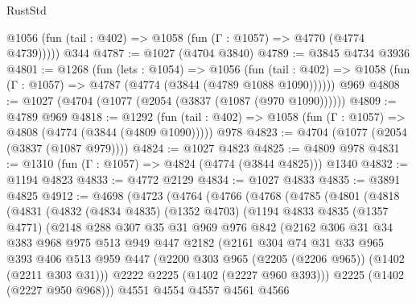 \begin{lexlean}{RustStd}
\begin{coremodule}
      @1056 (fun (tail : @402) => @1058 (fun (Γ : @1057) => @4770 (@4774 @4739)))))
    @344
@4787 := @1027 (@4704 @3840)
@4789 := @3845 @4734 @3936
@4801 := @1268
    (fun (lets : @1054) =>
    @1056
      (fun (tail : @402) => @1058 (fun (Γ : @1057) => @4787 (@4774 (@3844 (@4789 @1088 @1090))))))
    @969
@4808 := @1027 (@4704 (@1077 (@2054 (@3837 (@1087 (@970 @1090))))))
@4809 := @4789 @969
@4818 := @1292
    (fun (tail : @402) => @1058 (fun (Γ : @1057) => @4808 (@4774 (@3844 (@4809 @1090)))))
    @978
@4823 := @4704 (@1077 (@2054 (@3837 (@1087 @979))))
@4824 := @1027 @4823
@4825 := @4809 @978
@4831 := @1310 (fun (Γ : @1057) => @4824 (@4774 (@3844 @4825))) @1340
@4832 := @1194 @4823
@4833 := @4772 @2129
@4834 := @1027 @4833
@4835 := @3891 @4825
@4912 := @4698
    (@4723
      (@4764
        (@4766
          (@4768
            (@4785
              (@4801
                (@4818
                  (@4831
                    (@4832
                      (@4834 @4835)
                      (@1352 @4703)
                      (@1194
                        @4833
                        @4835
                        (@1357 @4771)
                        (@2148
                          @288
                          @307
                          @35
                          @31
                          @969
                          @976
                          @842
                          (@2162
                            @306
                            @31
                            @34
                            @383
                            @968
                            @975
                            @513
                            @949
                            @447
                            @2182
                            (@2161
                              @304
                              @74
                              @31
                              @33
                              @965
                              @393
                              @406
                              @513
                              @959
                              @447
                              (@2200 @303 @965 (@2205 (@2206 @965)) (@1402 (@2211 @303 @31)))
                              @2222
                              @2225
                              (@1402 (@2227 @960 @393)))
                            @2225
                            (@1402 (@2227 @950 @968)))
                          @4551
                          @4554
                          @4557
                          @4561
                          @4566

\end{coremodule}
\end{lexlean}
